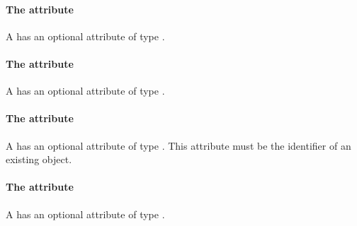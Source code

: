 \paragraph{The \fixttspace{} attribute}

A \Member has an optional attribute  of type .


\paragraph{The \fixttspace{} attribute}

A \Member has an optional attribute  of type
.


\paragraph{The \fixttspace{} attribute}

A \Member has an optional attribute  of type
.
This attribute must be the identifier of an existing \SBase object.


\paragraph{The \fixttspace{} attribute}

A \Member has an optional attribute  of type
.


